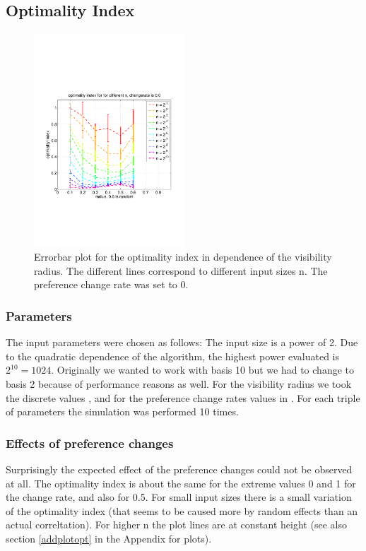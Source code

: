 \documentclass[11pt]{article}
\begin{document}
\subsection{Optimality Index}

\begin{figure}[t]
	\includegraphics[trim=0 180 0 180, clip, height=8cm]{../../code/data/2014_12_12_00_55_41/figure_4}
	\caption{Errorbar plot for the optimality index in dependence of the visibility radius. The different lines correspond to different input
	sizes n. The preference change rate was set to 0.}
	\label{fig:optimality2}
\end{figure}

\subsubsection{Parameters}

The input parameters were chosen as follows: The input size is a power of 2. Due to the quadratic dependence of the 
algorithm, the highest power evaluated is $2^{10}=1024$. Originally we wanted to work with basis 10 but we had to change to basis 2 because
of performance reasons as well. For the visibility radius we took the discrete values , and for the preference change rates
values in . For each triple of parameters the simulation was performed 10 times.

\subsubsection{Effects of preference changes}

Surprisingly the expected effect of the preference changes could not be observed at all. The optimality index is about the same for the extreme
values 0 and 1 for the change rate, and also for 0.5. For small input sizes there is a small variation of the optimality index (that seems to be
caused more by random effects than an actual correltation). For higher n the plot lines are at constant height (see also section \ref{addplotopt}
in the Appendix for plots).
\end{document}
